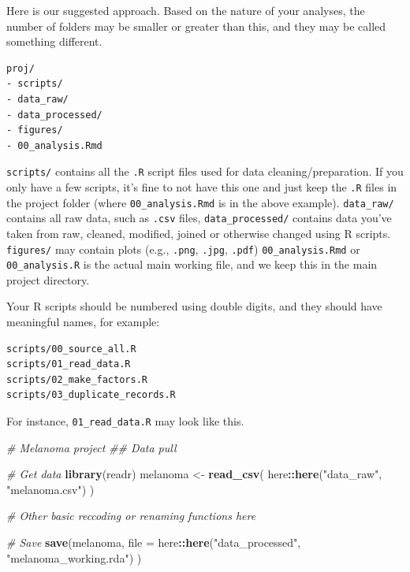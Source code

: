 \documentclass[
  12pt,
  krantz2]{krantz}
\makeatletter
\newenvironment{Shaded}{\begin{snugshade}}{\end{snugshade}}
\newcommand{\CommentTok}[1]{\textcolor[rgb]{0.56,0.35,0.01}{\textit{#1}}}
\newcommand{\DataTypeTok}[1]{\textcolor[rgb]{0.13,0.29,0.53}{#1}}
\newcommand{\KeywordTok}[1]{\textcolor[rgb]{0.13,0.29,0.53}{\textbf{#1}}}
\newcommand{\NormalTok}[1]{#1}
\newcommand{\OperatorTok}[1]{\textcolor[rgb]{0.81,0.36,0.00}{\textbf{#1}}}
\newcommand{\StringTok}[1]{\textcolor[rgb]{0.31,0.60,0.02}{#1}}
\newenvironment{kframe}{%
\medskip{}
\setlength{\fboxsep}{.8em}
 \def\at@end@of@kframe{}%
 \ifinner\ifhmode%
  \def\at@end@of@kframe{\end{minipage}}%
  \begin{minipage}{\columnwidth}%
 \fi\fi%
 \def\FrameCommand##1{\hskip\@totalleftmargin \hskip-\fboxsep
 \colorbox{shadecolor}{##1}\hskip-\fboxsep
     \hskip-\linewidth \hskip-\@totalleftmargin \hskip\columnwidth}%
 \MakeFramed {\advance\hsize-\width
   \@totalleftmargin\z@ \linewidth\hsize
   \@setminipage}}%
 {\par\unskip\endMakeFramed%
 \at@end@of@kframe}
\renewenvironment{Shaded}{\begin{kframe}}{\end{kframe}}
\makeatother
\begin{document}
Here is our suggested approach.
Based on the nature of your analyses, the number of folders may be smaller or greater than this, and they may be called something different.

\begin{verbatim}
proj/
- scripts/
- data_raw/
- data_processed/
- figures/
- 00_analysis.Rmd
\end{verbatim}

\texttt{scripts/} contains all the \texttt{.R} script files used for data cleaning/preparation. If you only have a few scripts, it's fine to not have this one and just keep the \texttt{.R} files in the project folder (where \texttt{00\_analysis.Rmd} is in the above example).
\texttt{data\_raw/} contains all raw data, such as \texttt{.csv} files, \texttt{data\_processed/} contains data you've taken from raw, cleaned, modified, joined or otherwise changed using R scripts.
\texttt{figures/} may contain plots (e.g., \texttt{.png}, \texttt{.jpg}, \texttt{.pdf})
\texttt{00\_analysis.Rmd} or \texttt{00\_analysis.R} is the actual main working file, and we keep this in the main project directory.

Your R scripts should be numbered using double digits, and they should have meaningful names, for example:

\begin{verbatim}
scripts/00_source_all.R
scripts/01_read_data.R
scripts/02_make_factors.R
scripts/03_duplicate_records.R
\end{verbatim}

For instance, \texttt{01\_read\_data.R} may look like this.

\begin{Shaded}
\begin{Highlighting}[]
\CommentTok{# Melanoma project}
\CommentTok{## Data pull}

\CommentTok{# Get data}
\KeywordTok{library}\NormalTok{(readr)}
\NormalTok{melanoma <-}\StringTok{ }\KeywordTok{read_csv}\NormalTok{(}
\NormalTok{  here}\OperatorTok{::}\KeywordTok{here}\NormalTok{(}\StringTok{"data_raw"}\NormalTok{, }\StringTok{"melanoma.csv"}\NormalTok{)}
\NormalTok{)}

\CommentTok{# Other basic reccoding or renaming functions here}

\CommentTok{# Save}
\KeywordTok{save}\NormalTok{(melanoma, }\DataTypeTok{file =} 
\NormalTok{  here}\OperatorTok{::}\KeywordTok{here}\NormalTok{(}\StringTok{"data_processed"}\NormalTok{, }\StringTok{"melanoma_working.rda"}\NormalTok{)}
\NormalTok{)}
\end{Highlighting}
\end{Shaded}
\end{document}
